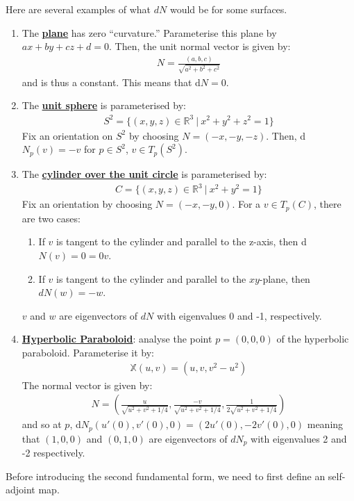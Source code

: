 \documentclass[11pt]{scrartcl}
\newcommand{\R}[0]{\mathbb{R}}
\theoremstyle{definition}
\theoremstyle{remark}
\newcommand{\dfn}[1]{\textbf{\underline{#1}}}
\begin{document}
{Here are several examples of what $dN$ would be for some surfaces. 
\begin{enumerate}[noitemsep]
	\item The \dfn{plane} has zero ``curvature.'' Parameterise this plane by $ax + by + cz + d =0$. Then, the unit normal vector is given by: 
	\begin{align*}
		N = \frac{(a,b,c)}{\sqrt{a^2 + b^2 + c^2}}
	\end{align*}
	and is thus a constant. This means that d$N =0$. 
	\item The \dfn{unit sphere} is parameterised by: 
	\begin{align*}
		S^2 = \{ (x,y,z) \in \R^3\ |\ x^2 + y^2 + z^2 = 1 \}
	\end{align*}
	Fix an orientation on $S^2$ by choosing $N= (-x, -y, -z)$. Then, d$N_p(v) = -v$ for $p \in S^2$, $v \in T_p(S^2)$. 
	\item The \dfn{cylinder over the unit circle} is parameterised by:  
	\begin{align*}
		C = \{ (x,y,z) \in \R^3\ |\ x^2 + y^2 = 1 \} 
	\end{align*}
	Fix an orientation by choosing $N= (-x, -y, 0)$. For a $v \in T_p(C)$, there are two cases: 
	\begin{enumerate}[noitemsep]
		\item If $v$ is tangent to the cylinder and parallel to the z-axis, then d$N(v) = 0 = 0v$. 
		\item If $v$ is tangent to the cylinder and parallel to the $xy$-plane, then $dN(w) = -w$. 
	\end{enumerate}
	$v$ and $w$ are eigenvectors of $dN$ with eigenvalues 0 and -1, respectively. 
	\item \dfn{Hyperbolic Paraboloid}: analyse the point $p=(0,0,0)$ of the hyperbolic paraboloid. Parameterise it by: 
	\begin{align*}
		\mathbb{X}(u,v) = ( u, v, v^2 - u^2) 
	\end{align*}
	The normal vector is given by: 
	\begin{align*}
		N = \left( 	\frac{u}{\sqrt{u^2 + v^2 + 1/4}}, \frac{-v}{\sqrt{u^2 + v^2 + 1/4}}	, \frac{1}{2 \sqrt{u^2 + v^2 + 1/4}}		\right) 
	\end{align*}
	and so at $p$, d$N_p (u'(0), v'(0), 0) = (2u'(0), -2v'(0), 0)$ meaning that $(1,0,0)$ and $(0,1,0)$ are eigenvectors of $dN_p$ with eigenvalues 2 and -2 respectively. 
\end{enumerate}
Before introducing the second fundamental form, we need to first define an self-adjoint map. 

}
\end{document}
